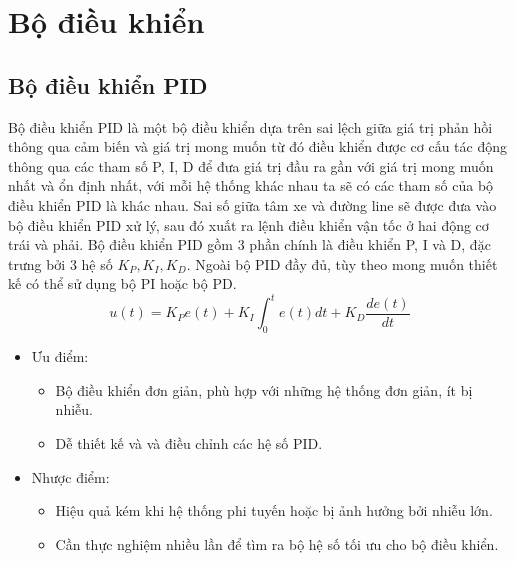     \section{Bộ điều khiển}
    \subsection{Bộ điều khiển PID}
    \hspace*{0.6cm}Bộ điều khiển PID là một bộ điều khiển dựa trên sai lệch giữa giá trị phản hồi
    thông qua cảm biến và giá trị mong muốn từ đó điều khiển được cơ cấu tác động thông
    qua các tham số P, I, D để đưa giá trị đầu ra gần với giá trị mong muốn nhất và ổn định
    nhất, với mỗi hệ thống khác nhau ta sẽ có các tham số của bộ điều khiển PID là khác
    nhau. Sai số giữa tâm xe và đường line sẽ được đưa vào bộ điều khiển PID xử lý, sau đó
    xuất ra lệnh điều khiển vận tốc ở hai động cơ trái và phải. Bộ điều khiển PID gồm 3
    phần chính là điều khiển P, I và D, đặc trưng bởi 3 hệ số $K_P, K_I, K_D$. Ngoài bộ PID đầy đủ, tùy theo mong muốn thiết kế có thể sử dụng bộ PI hoặc bộ PD.
    \begin{equation*}
        u(t) = K_P e(t) + K_I \int_0^t e(t) dt + K_D \dfrac{de(t)}{dt}
    \end{equation*}
    \begin{itemize}
        \item Ưu điểm: 
        \begin{itemize}[label = \textendash]
            \item Bộ điều khiển đơn giản, phù hợp với những hệ thống đơn giản, ít bị nhiễu.
            \item Dễ thiết kế và và điều chỉnh các hệ số PID.
        \end{itemize}
        \item Nhược điểm:
        \begin{itemize}[label = \textendash]
            \item Hiệu quả kém khi hệ thống phi tuyến hoặc bị ảnh hưởng bởi nhiễu lớn.
            \item Cần thực nghiệm nhiều lần để tìm ra bộ hệ số tối ưu cho bộ điều khiển.
        \end{itemize}
    \end{itemize}
